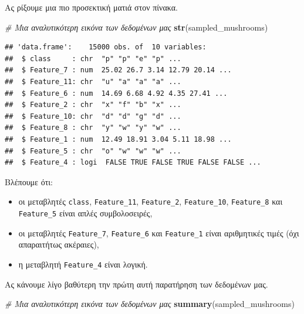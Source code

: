\documentclass[
]{article}
\newenvironment{Shaded}{\begin{snugshade}}{\end{snugshade}}
\newcommand{\CommentTok}[1]{\textcolor[rgb]{0.56,0.35,0.01}{\textit{#1}}}
\newcommand{\FunctionTok}[1]{\textcolor[rgb]{0.13,0.29,0.53}{\textbf{#1}}}
\newcommand{\NormalTok}[1]{#1}
\begin{document}
Ας ρίξουμε μια πιο προσεκτική ματιά στον πίνακα.

\begin{Shaded}
\begin{Highlighting}[]
\CommentTok{\# Μια αναλυτικότερη εικόνα των δεδομένων μας}
\FunctionTok{str}\NormalTok{(sampled\_mushrooms)}
\end{Highlighting}
\end{Shaded}

\begin{verbatim}
## 'data.frame':    15000 obs. of  10 variables:
##  $ class     : chr  "p" "p" "e" "p" ...
##  $ Feature_7 : num  25.02 26.7 3.14 12.79 20.14 ...
##  $ Feature_11: chr  "u" "a" "a" "a" ...
##  $ Feature_6 : num  14.69 6.68 4.92 4.35 27.41 ...
##  $ Feature_2 : chr  "x" "f" "b" "x" ...
##  $ Feature_10: chr  "d" "d" "g" "d" ...
##  $ Feature_8 : chr  "y" "w" "y" "w" ...
##  $ Feature_1 : num  12.49 18.91 3.04 5.11 18.98 ...
##  $ Feature_5 : chr  "o" "w" "w" "w" ...
##  $ Feature_4 : logi  FALSE TRUE FALSE TRUE FALSE FALSE ...
\end{verbatim}

Βλέπουμε ότι:

\begin{itemize}
\item
  οι μεταβλητές \texttt{class}, \texttt{Feature\_11},
  \texttt{Feature\_2}, \texttt{Feature\_10}, \texttt{Feature\_8} και
  \texttt{Feature\_5} είναι απλές συμβολοσειρές,
\item
  οι μεταβλητές \texttt{Feature\_7}, \texttt{Feature\_6} και
  \texttt{Feature\_1} είναι αριθμητικές τιμές (όχι απαραιτήτως
  ακέραιες),
\item
  η μεταβλητή \texttt{Feature\_4} είναι λογική.
\end{itemize}

Ας κάνουμε λίγο βαθύτερη την πρώτη αυτή παρατήρηση των δεδομένων μας.

\begin{Shaded}
\begin{Highlighting}[]
\CommentTok{\# Μια αναλυτικότερη εικόνα των δεδομένων μας}
\FunctionTok{summary}\NormalTok{(sampled\_mushrooms)}
\end{Highlighting}
\end{Shaded}
\end{document}
